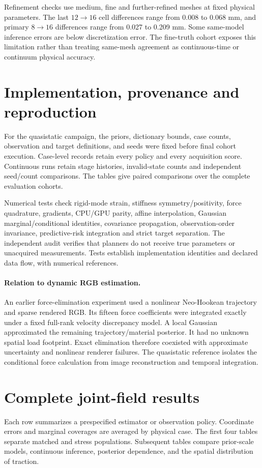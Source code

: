 \documentclass[10pt,twocolumn,letterpaper]{article}
\begin{document}
Refinement checks use medium, fine and further-refined meshes at fixed physical parameters. The last $12\to 16$ cell differences range from 0.008 to 0.068 mm, and primary $8\to 16$ differences range from 0.027 to 0.209 mm. Some same-model inference errors are below discretization error. The fine-truth cohort exposes this limitation rather than treating same-mesh agreement as continuous-time or continuum physical accuracy.

\section{Implementation, provenance and reproduction}
For the quasistatic campaign, the priors, dictionary bounds, case counts, observation and target definitions, and seeds were fixed before final cohort execution. Case-level records retain every policy and every acquisition score. Continuous runs retain stage histories, invalid-state counts and independent seed/count comparisons. The tables give paired comparisons over the complete evaluation cohorts.

Numerical tests check rigid-mode strain, stiffness symmetry/positivity, force quadrature, gradients, CPU/GPU parity, affine interpolation, Gaussian marginal/conditional identities, covariance propagation, observation-order invariance, predictive-risk integration and strict target separation. The independent audit verifies that planners do not receive true parameters or unacquired measurements. Tests establish implementation identities and declared data flow, with numerical references.

\newpage

\paragraph{Relation to dynamic RGB estimation.} An earlier force-elimination experiment used a nonlinear Neo-Hookean trajectory and sparse rendered RGB. Its fifteen force coefficients were integrated exactly under a fixed full-rank velocity discrepancy model. A local Gaussian approximated the remaining trajectory/material posterior. It had no unknown spatial load footprint. Exact elimination therefore coexisted with approximate uncertainty and nonlinear renderer failures. The quasistatic reference isolates the conditional force calculation from image reconstruction and temporal integration.

\onecolumn\raggedbottom
\section{Complete joint-field results}
Each row summarizes a prespecified estimator or observation policy. Coordinate errors and marginal coverages are averaged by physical case. The first four tables separate matched and stress populations. Subsequent tables compare prior-scale models, continuous inference, posterior dependence, and the spatial distribution of traction.
\end{document}
